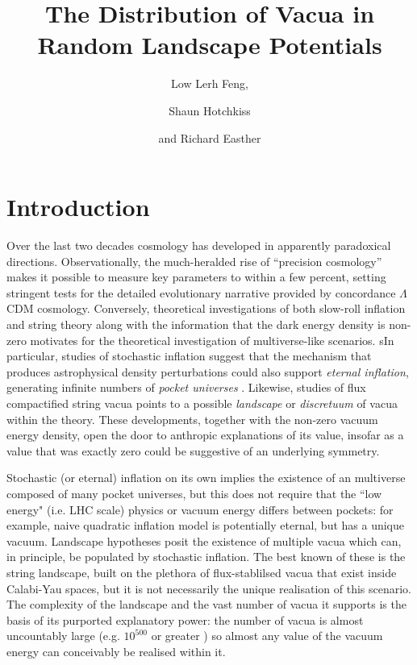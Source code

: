\documentclass[12pt]{article}
\title{The Distribution of Vacua in Random Landscape Potentials}
\author{Low Lerh Feng,}
\author{Shaun Hotchkiss}
\author{and Richard Easther}
\affiliation{Department of Physics,\\ University of Auckland, \\Private Bag 92019,\\ Auckland, New Zealand}
\begin{document}
\maketitle

\section{Introduction}

Over the last two decades cosmology has developed in apparently paradoxical directions. Observationally, the much-heralded rise of ``precision cosmology'' makes it possible to measure key parameters to within a few percent, setting stringent tests for the detailed evolutionary narrative provided by concordance $\Lambda$CDM cosmology\cite{Planck2018,DES}. Conversely, theoretical investigations of both slow-roll inflation and string theory along with the information that the dark energy density is non-zero motivates for the theoretical investigation of multiverse-like scenarios. sIn particular, studies of stochastic inflation \cite{Linde1986,Adshead2007} suggest that the mechanism that produces astrophysical density perturbations could also support {\em eternal inflation\/}, generating infinite numbers of  {\em pocket universes\/} \cite{Guth2001}. Likewise, studies of flux compactified string vacua points to a possible  {\em landscape\/} \cite{Susskind2003} or {\em discretuum\/} \cite{Bousso2000}   of vacua within the theory. These developments, together with the non-zero vacuum energy density, open the door to anthropic explanations of its value, insofar as a value that was  exactly zero could be suggestive of an underlying symmetry. 

Stochastic (or eternal) inflation on its own implies the existence of an multiverse composed of many pocket universes, but this does not require that the ``low energy" (i.e. LHC scale) physics or vacuum energy differs between pockets: for example, naive quadratic inflation model is potentially eternal, but has a unique vacuum.  Landscape hypotheses posit the existence of multiple vacua which can, in principle, be populated by stochastic inflation. The best known of these is the string landscape, built on the plethora of flux-stablilsed vacua that exist inside Calabi-Yau spaces, but it is not necessarily the unique realisation of this scenario. The complexity of the landscape  and the vast number of vacua it supports is the basis of its purported explanatory power: the number of vacua is almost uncountably large (e.g. $10^{500}$ or greater \cite{Douglas2003}) so almost any value of the vacuum energy can conceivably be realised within it. 
 
\end{document}
